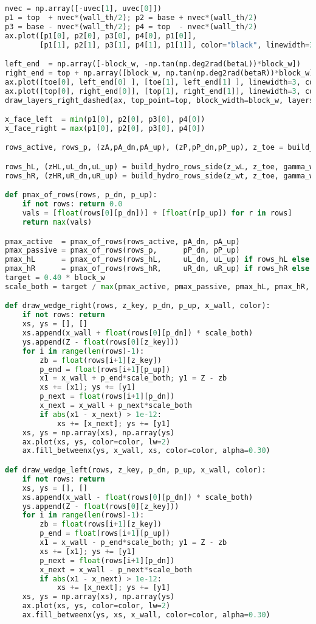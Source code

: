 \begin{lstlisting}[language=Python]
nvec = np.array([-uvec[1], uvec[0]])
p1 = top  + nvec*(wall_th/2); p2 = base + nvec*(wall_th/2)
p3 = base - nvec*(wall_th/2); p4 = top  - nvec*(wall_th/2)
ax.plot([p1[0], p2[0], p3[0], p4[0], p1[0]],
        [p1[1], p2[1], p3[1], p4[1], p1[1]], color="black", linewidth=3)

left_end  = np.array([-block_w, -np.tan(np.deg2rad(betaL))*block_w])
right_end = top + np.array([block_w, np.tan(np.deg2rad(betaR))*block_w])
ax.plot([toe[0], left_end[0] ], [toe[1], left_end[1] ], linewidth=3, color="black")
ax.plot([top[0], right_end[0]], [top[1], right_end[1]], linewidth=3, color="black")
draw_layers_right_dashed(ax, top_point=top, block_width=block_w, layers=layers, show_params=False)

x_face_left  = min(p1[0], p2[0], p3[0], p4[0])
x_face_right = max(p1[0], p2[0], p3[0], p4[0])

rows_active, rows_p, (zA,pA_dn,pA_up), (zP,pP_dn,pP_up), z_toe = build_rows_for_d(d_star)

rows_hL, (zHL,uL_dn,uL_up) = build_hydro_rows_side(z_wL, z_toe, gamma_w)
rows_hR, (zHR,uR_dn,uR_up) = build_hydro_rows_side(z_wt, z_toe, gamma_w)

def pmax_of_rows(rows, p_dn, p_up):
    if not rows: return 0.0
    vals = [float(rows[0][p_dn])] + [float(r[p_up]) for r in rows]
    return max(vals)

pmax_active  = pmax_of_rows(rows_active, pA_dn, pA_up)
pmax_passive = pmax_of_rows(rows_p,      pP_dn, pP_up)
pmax_hL      = pmax_of_rows(rows_hL,     uL_dn, uL_up) if rows_hL else 0.0
pmax_hR      = pmax_of_rows(rows_hR,     uR_dn, uR_up) if rows_hR else 0.0
target = 0.40 * block_w
scale_both = target / max(pmax_active, pmax_passive, pmax_hL, pmax_hR, 1e-12)

def draw_wedge_right(rows, z_key, p_dn, p_up, x_wall, color):
    if not rows: return
    xs, ys = [], []
    xs.append(x_wall + float(rows[0][p_dn]) * scale_both)
    ys.append(Z - float(rows[0][z_key]))
    for i in range(len(rows)-1):
        zb = float(rows[i+1][z_key])
        p_end = float(rows[i+1][p_up])
        x1 = x_wall + p_end*scale_both; y1 = Z - zb
        xs += [x1]; ys += [y1]
        p_next = float(rows[i+1][p_dn])
        x_next = x_wall + p_next*scale_both
        if abs(x1 - x_next) > 1e-12:
            xs += [x_next]; ys += [y1]
    xs, ys = np.array(xs), np.array(ys)
    ax.plot(xs, ys, color=color, lw=2)
    ax.fill_betweenx(ys, x_wall, xs, color=color, alpha=0.30)

def draw_wedge_left(rows, z_key, p_dn, p_up, x_wall, color):
    if not rows: return
    xs, ys = [], []
    xs.append(x_wall - float(rows[0][p_dn]) * scale_both)
    ys.append(Z - float(rows[0][z_key]))
    for i in range(len(rows)-1):
        zb = float(rows[i+1][z_key])
        p_end = float(rows[i+1][p_up])
        x1 = x_wall - p_end*scale_both; y1 = Z - zb
        xs += [x1]; ys += [y1]
        p_next = float(rows[i+1][p_dn])
        x_next = x_wall - p_next*scale_both
        if abs(x1 - x_next) > 1e-12:
            xs += [x_next]; ys += [y1]
    xs, ys = np.array(xs), np.array(ys)
    ax.plot(xs, ys, color=color, lw=2)
    ax.fill_betweenx(ys, xs, x_wall, color=color, alpha=0.30)


\end{lstlisting}
